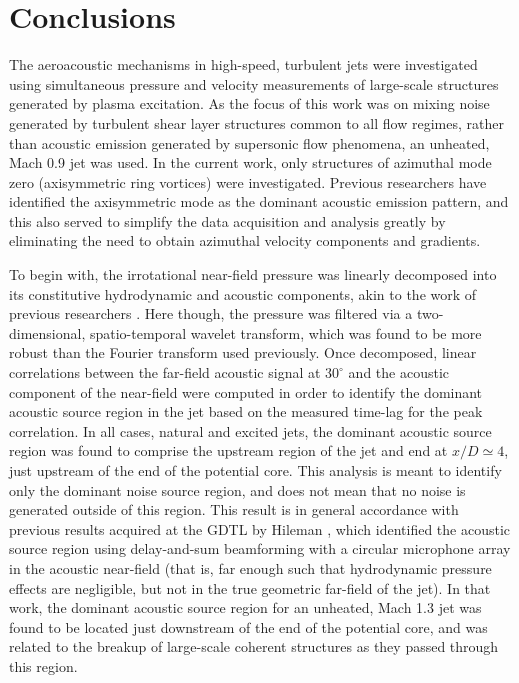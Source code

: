 \chapter{Conclusions}
The aeroacoustic mechanisms in high-speed, turbulent jets were investigated using simultaneous pressure and velocity measurements of large-scale structures generated by plasma excitation.
As the focus of this work was on mixing noise generated by turbulent shear layer structures common to all flow regimes, rather than acoustic emission generated by supersonic flow phenomena, an unheated, Mach 0.9 jet was used.
In the current work, only structures of azimuthal mode zero (axisymmetric ring vortices) were investigated. Previous researchers have identified the axisymmetric mode as the dominant acoustic emission pattern, and this also served to simplify the data acquisition and analysis greatly by eliminating the need to obtain azimuthal velocity components and gradients.

To begin with, the irrotational near-field pressure was linearly decomposed into its constitutive hydrodynamic and acoustic components, akin to the work of previous researchers \citep{Tinney2008}.
Here though, the pressure was filtered via a two-dimensional, spatio-temporal wavelet transform, which was found to be more robust than the Fourier transform used previously.
Once decomposed, linear correlations between the far-field acoustic signal at $30^\circ$ and the acoustic component of the near-field were computed in order to identify the dominant acoustic source region in the jet based on the measured time-lag for the peak correlation.
In all cases, natural and excited jets, the dominant acoustic source region was found to comprise the upstream region of the jet and end at $x/D \simeq 4$, just upstream of the end of the potential core.
This analysis is meant to identify only the dominant noise source region, and does not mean that no noise is generated outside of this region.
This result is in general accordance with previous results acquired at the GDTL by Hileman \etal \citep{Hileman2005}, which identified the acoustic source region using delay-and-sum beamforming with a circular microphone array in the acoustic near-field (that is, far enough such that hydrodynamic pressure effects are negligible, but not in the true geometric far-field of the jet).
In that work, the dominant acoustic source region for an unheated, Mach 1.3 jet was found to be located just downstream of the end of the potential core, and was related to the breakup of large-scale coherent structures as they passed through this region.

